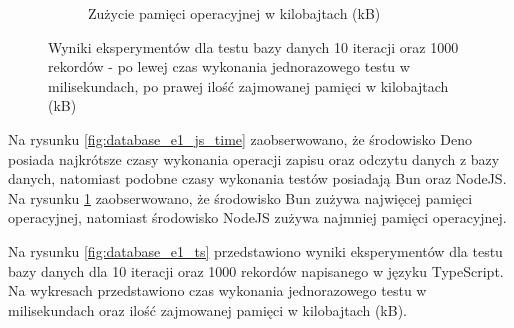 \begin{figure}[H]
\begin{subfigure}[b]{0.44\textwidth}
    \caption{Zużycie pamięci operacyjnej w kilobajtach (kB)}
    \label{fig:database_e1_js_memory}
  \end{subfigure}
  \caption{Wyniki eksperymentów dla testu bazy danych 10 iteracji oraz 1000 rekordów - po lewej czas wykonania jednorazowego testu w milisekundach, po prawej ilość zajmowanej pamięci w kilobajtach (kB)}
  \label{fig:database_e1_js}
\end{figure}

Na rysunku \ref{fig:database_e1_js_time} zaobserwowano, że środowisko Deno posiada najkrótsze czasy wykonania operacji zapisu oraz odczytu danych z bazy danych, natomiast podobne czasy wykonania testów posiadają Bun oraz NodeJS. Na rysunku \ref{fig:database_e1_js_memory} zaobserwowano, że środowisko Bun zużywa najwięcej pamięci operacyjnej, natomiast środowisko NodeJS zużywa najmniej pamięci operacyjnej.

Na rysunku \ref{fig:database_e1_ts} przedstawiono wyniki eksperymentów dla testu bazy danych dla 10 iteracji oraz 1000 rekordów napisanego w języku TypeScript. Na wykresach przedstawiono czas wykonania jednorazowego testu w milisekundach oraz ilość zajmowanej pamięci w kilobajtach (kB).

